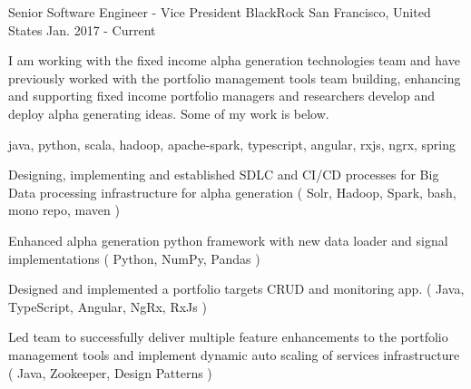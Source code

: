 \cventry
    {Senior Software Engineer - Vice President} %
    {BlackRock} %
    {San Francisco, United States} %
    {Jan. 2017 - Current} %
    {
    \begin{cvitems} %
        I am working with the fixed income alpha generation technologies team and have previously worked with the portfolio management tools team building,
    enhancing and supporting fixed income portfolio managers and researchers develop and deploy alpha generating ideas. Some of my work is below.
        \item { java, python, scala, hadoop, apache-spark, typescript, angular, rxjs, ngrx, spring}
        \item { Designing, implementing and established SDLC and CI/CD processes for Big Data processing infrastructure for alpha generation ( Solr, Hadoop, Spark,
        bash, mono repo, maven ) }
        \item { Enhanced alpha generation python framework with new data loader and signal implementations ( Python, NumPy, Pandas )}
        \item { Designed and implemented a portfolio targets CRUD and monitoring app. ( Java, TypeScript, Angular, NgRx, RxJs )  }
        \item { Led team to successfully deliver multiple feature enhancements to the portfolio management tools and implement dynamic auto scaling of services
        infrastructure ( Java, Zookeeper, Design Patterns )}
    \end{cvitems}
    }





